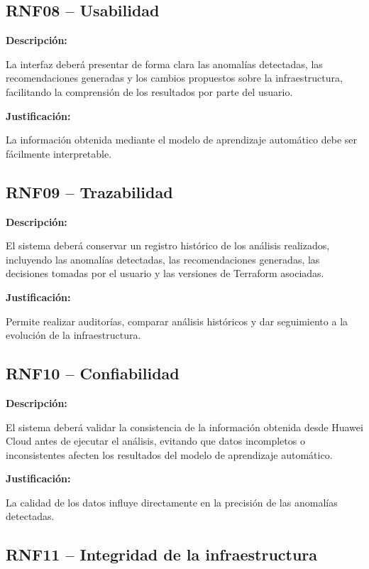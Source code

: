 \subsection{RNF08 -- Usabilidad}

\noindent \textbf{Descripción:}

La interfaz deberá presentar de forma clara las anomalías detectadas, las recomendaciones generadas y los cambios propuestos sobre la infraestructura, facilitando la comprensión de los resultados por parte del usuario.

\noindent \textbf{Justificación:}

La información obtenida mediante el modelo de aprendizaje automático debe ser fácilmente interpretable.

\subsection{RNF09 -- Trazabilidad}

\noindent \textbf{Descripción:}

El sistema deberá conservar un registro histórico de los análisis realizados, incluyendo las anomalías detectadas, las recomendaciones generadas, las decisiones tomadas por el usuario y las versiones de Terraform asociadas.

\noindent \textbf{Justificación:}

Permite realizar auditorías, comparar análisis históricos y dar seguimiento a la evolución de la infraestructura.

\subsection{RNF10 -- Confiabilidad}

\noindent \textbf{Descripción:}

El sistema deberá validar la consistencia de la información obtenida desde Huawei Cloud antes de ejecutar el análisis, evitando que datos incompletos o inconsistentes afecten los resultados del modelo de aprendizaje automático.

\noindent \textbf{Justificación:}

La calidad de los datos influye directamente en la precisión de las anomalías detectadas.

\subsection{RNF11 -- Integridad de la infraestructura}

